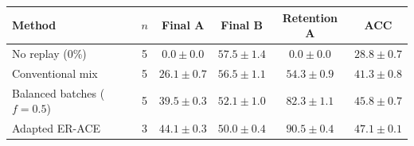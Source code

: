 \begin{tabular}{lccccc}
\hline
Method & $n$ & Final A & Final B & Retention A & ACC \\
\hline
No replay (0\%) & 5 & $0.0 \pm 0.0$ & $57.5 \pm 1.4$ & $0.0 \pm 0.0$ & $28.8 \pm 0.7$ \\
Conventional mix & 5 & $26.1 \pm 0.7$ & $56.5 \pm 1.1$ & $54.3 \pm 0.9$ & $41.3 \pm 0.8$ \\
Balanced batches ($f=0.5$) & 5 & $39.5 \pm 0.3$ & $52.1 \pm 1.0$ & $82.3 \pm 1.1$ & $45.8 \pm 0.7$ \\
Adapted ER-ACE & 3 & $44.1 \pm 0.3$ & $50.0 \pm 0.4$ & $90.5 \pm 0.4$ & $47.1 \pm 0.1$ \\
\hline
\end{tabular}
